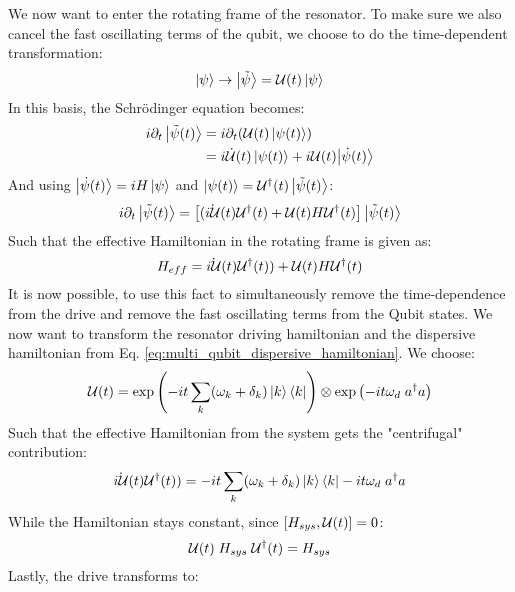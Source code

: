 \vspace{1 cm}
We now want to enter the rotating frame of the resonator. To make sure we also cancel the fast oscillating terms of the qubit, we choose to do the time-dependent transformation:
\begin{equation}
    \ket{\psi} \to \ket{\tilde{\psi}} = \mathcal{U}(t)\ket{\psi}
\end{equation}
In this basis, the Schrödinger equation becomes:
\begin{align*}
    i\partial_t \ket{\tilde{\psi}(t)} &= i \partial_t (\mathcal{U}(t) \ket{{\psi}(t)}) \\
    &= i \dot{\mathcal{U}}(t)\ket{\psi(t)} + i \mathcal{U}(t) {\ket{\Dot{{\psi}}(t)}}
\end{align*}
And using $\ket{\dot{\psi}(t)} = i H \ket{\psi}$ and $\ket{\psi(t)} = \mathcal{U}^\dagger(t) \ket{\tilde{\psi}(t)}$:
\begin{equation}
    i \partial_t \ket{\Tilde{\psi}(t)}= \left[(\dot{i \mathcal{U}}{(t)}\mathcal{U}^\dagger(t) + \mathcal{U}(t) H \mathcal{U}^\dagger(t)\right]\ket{\tilde{\psi}(t)}
\end{equation}
Such that the effective Hamiltonian in the rotating frame is given as:
\begin{equation}
    H_{eff} = \dot{i \mathcal{U}}{(t)}\mathcal{U}^\dagger(t)) + \mathcal{U}(t) H \mathcal{U}^\dagger(t)
\end{equation}
It is now possible, to use this fact to simultaneously remove the time-dependence from the drive and remove the fast oscillating terms from the Qubit states. We now want to transform the resonator driving hamiltonian and the dispersive hamiltonian from Eq. \ref{eq:multi_qubit_dispersive_hamiltonian}. We choose: 
\begin{equation}
    \mathcal{U}(t) = \exp\left(- i t \sum_k (\omega_k + \delta_k) \ket{k}\bra{k}\right) \otimes \exp \left(- i t \omega_d \;  a^\dagger a \right)
\end{equation}
Such that the effective Hamiltonian from the system gets the "centrifugal" contribution:
\begin{equation}
    \dot{i \mathcal{U}}{(t)}\mathcal{U}^\dagger(t)) = - i t \sum_k (\omega_k + \delta_k) \ket{k}\bra{k} - it \omega_d \;  a^\dagger a
\end{equation}
While the Hamiltonian stays constant, since $\comm{H_{sys}}{\unitary(t)} = 0$:
\begin{equation}
    \mathcal{U}(t) \; H_{sys} \; \mathcal{U}^\dagger(t) = H_{sys}
\end{equation}
Lastly, the drive transforms to:

